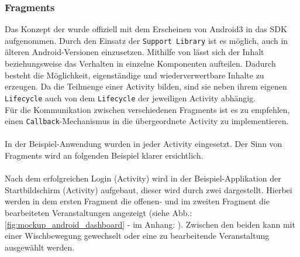 \documentclass[Bachelorarbeit.tex]{subfiles}
\begin{document}
\subsubsection*{Fragments}
\label{subsubsec:fragments}
Das Konzept der  wurde offiziell mit dem Erscheinen von Android3 in das \ac{SDK} aufgenommen. Durch den Einsatz der \texttt{Support Library} ist es möglich,  auch in älteren Android-Versionen einzusetzen.
Mithilfe von  lässt sich der Inhalt beziehungsweise das Verhalten in einzelne Komponenten aufteilen.
Dadurch besteht die Möglichkeit, eigenständige und wiederverwertbare Inhalte zu erzeugen. 
Da  die Teilmenge einer Activity bilden, sind sie neben ihrem eigenen \texttt{Lifecycle} auch von dem \texttt{Lifecycle} der jeweiligen Activity abhängig.\\
\newpage
Für die Kommunikation zwischen verschiedenen Fragments ist es zu  empfehlen, einen \texttt{Callback}-Mechanismus in die übergeordnete Activity zu implementieren.
\parencites()()[vgl.:][Seite 96: Fundamental Android UI Designs]{android_profDev}[sowie:][]{android_fragments} \\
\\
In der Beispiel-Anwendung wurden in jeder Activity   eingesetzt. 
Der Sinn von Fragments wird an folgenden Beispiel klarer ersichtlich. \\
\\
Nach dem erfolgreichen Login (Activity) wird in der Beispiel-Applikation der Startbildschirm (Activity) aufgebaut, dieser wird durch zwei  dargestellt. 
Hierbei werden in dem ersten Fragment die offenen- und im zweiten Fragment die bearbeiteten Veranstaltungen angezeigt (siehe Abb.: \ref{fig:mockup_android_dashboard} -  im Anhang: ).
Zwischen den beiden  kann mit einer Wischbewegung gewechselt oder eine zu bearbeitende Veranstaltung ausgewählt werden.

\end{document}
